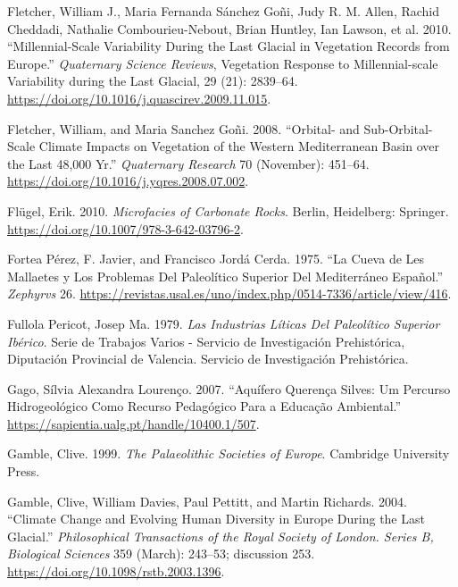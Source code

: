 \documentclass[
  a4paper,
  DIV=11,
  numbers=noendperiod]{scrreprt}
\newlength{\cslhangindent}
\newenvironment{CSLReferences}[2] %
 {\begin{list}{}{%
  \setlength{\itemindent}{0pt}
  \setlength{\leftmargin}{0pt}
  \setlength{\parsep}{0pt}
  \ifodd #1
   \setlength{\leftmargin}{\cslhangindent}
   \setlength{\itemindent}{-1\cslhangindent}
  \fi
  \setlength{\itemsep}{#2\baselineskip}}}
 {\end{list}}
\begin{document}
\begin{CSLReferences}{1}{0}
Fletcher, William J., Maria Fernanda Sánchez Goñi, Judy R. M. Allen,
Rachid Cheddadi, Nathalie Combourieu-Nebout, Brian Huntley, Ian Lawson,
et al. 2010. {``Millennial-Scale Variability During the Last Glacial in
Vegetation Records from {Europe}.''} \emph{Quaternary Science Reviews},
Vegetation {Response} to {Millennial-scale Variability} during the {Last
Glacial}, 29 (21): 2839--64.
\url{https://doi.org/10.1016/j.quascirev.2009.11.015}.

Fletcher, William, and Maria Sanchez Goñi. 2008. {``Orbital- and
Sub-Orbital-Scale Climate Impacts on Vegetation of the Western
{Mediterranean} Basin over the Last 48,000 Yr.''} \emph{Quaternary
Research} 70 (November): 451--64.
\url{https://doi.org/10.1016/j.yqres.2008.07.002}.

Flügel, Erik. 2010. \emph{Microfacies of {Carbonate Rocks}}. Berlin,
Heidelberg: Springer. \url{https://doi.org/10.1007/978-3-642-03796-2}.

Fortea Pérez, F. Javier, and Francisco Jordá Cerda. 1975. {``La Cueva de
Les Mallaetes y Los Problemas Del Paleolítico Superior Del Mediterráneo
Español.''} \emph{Zephyrvs} 26.
\url{https://revistas.usal.es/uno/index.php/0514-7336/article/view/416}.

Fullola Pericot, Josep Ma. 1979. \emph{Las Industrias Líticas Del
Paleolítico Superior Ibérico}. Serie de Trabajos Varios - Servicio de
Investigación Prehistórica, Diputación Provincial de Valencia. Servicio
de Investigación Prehistórica.

Gago, Sílvia Alexandra Lourenço. 2007. {``Aquífero Querença Silves: Um
Percurso Hidrogeológico Como Recurso Pedagógico Para a Educação
Ambiental.''} \url{https://sapientia.ualg.pt/handle/10400.1/507}.

Gamble, Clive. 1999. \emph{The {Palaeolithic Societies} of {Europe}}.
Cambridge University Press.

Gamble, Clive, William Davies, Paul Pettitt, and Martin Richards. 2004.
{``Climate Change and Evolving Human Diversity in Europe During the Last
Glacial.''} \emph{Philosophical Transactions of the Royal Society of
London. Series B, Biological Sciences} 359 (March): 243--53; discussion
253. \url{https://doi.org/10.1098/rstb.2003.1396}.


\end{CSLReferences}
\end{document}
